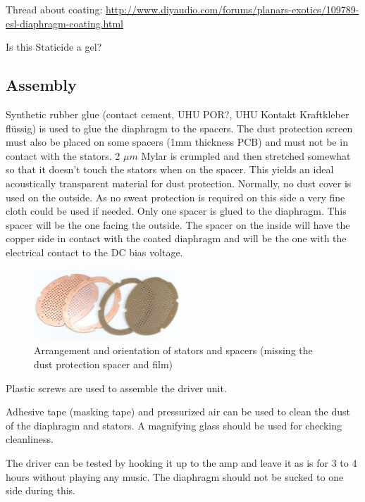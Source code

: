\documentclass{article}
\begin{document}
Thread about coating: \url{http://www.diyaudio.com/forums/planars-exotics/109789-esl-diaphragm-coating.html}

Is this Staticide a gel?

\subsection{Assembly}
\label{s:driver:assembly}
Synthetic rubber glue (contact cement, UHU POR?, UHU Kontakt Kraftkleber fl\"ussig) is used to glue the diaphragm to the spacers. The dust protection screen must also be placed on some spacers (1mm thickness PCB) and must not be in contact with the stators. 2 $\mu m$ Mylar is crumpled and then stretched somewhat so that it doesn't touch the stators when on the spacer. This yields an ideal acoustically transparent material for dust protection. Normally, no dust cover is used on the outside. As no sweat protection is required on this side a very fine cloth could be used if needed. Only one spacer is glued to the diaphragm. This spacer will be the one facing the outside. The spacer on the inside will have the copper side in contact with the coated diaphragm and will be the one with the electrical contact to the DC bias voltage.
\begin{figure}[htb]
    \centering
    \includegraphics[width=0.5\textwidth]{images/arrangement.png}
    \caption{Arrangement and orientation of stators and spacers (missing the dust protection spacer and film)}
    \label{f:driver:assembly:arrangement}
\end{figure}

Plastic screws are used to assemble the driver unit.

Adhesive tape (masking tape) and pressurized air can be used to clean the dust of the diaphragm and stators. A magnifying glass should be used for checking cleanliness.

The driver can be tested by hooking it up to the amp and leave it as is for 3 to 4 hours without playing any music. The diaphragm should not be sucked to one side during this.
\end{document}
